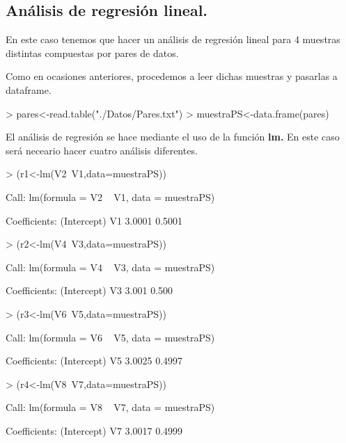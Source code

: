 \documentclass [a4paper] {article}
\begin{document}
\subsection{Análisis de regresión lineal.}
En este caso tenemos que hacer un análisis de regresión lineal para 4 muestras distintas compuestas
por pares de datos.

\bigskip
Como en ocasiones anteriores, procedemos a leer dichas muestras y pasarlas a dataframe.
\begin{Schunk}
\begin{Sinput}
> pares<-read.table("./Datos/Pares.txt")
> muestraPS<-data.frame(pares)
\end{Sinput}
\end{Schunk}

\bigskip
El análisis de regresión se hace mediante el uso de la función \textbf{lm.} En este caso será neceario hacer cuatro análisis diferentes.
\begin{Schunk}
\begin{Sinput}
> (r1<-lm(V2~V1,data=muestraPS))
\end{Sinput}
\begin{Soutput}
Call:
lm(formula = V2 ~ V1, data = muestraPS)

Coefficients:
(Intercept)           V1  
     3.0001       0.5001  
\end{Soutput}
\begin{Sinput}
> (r2<-lm(V4~V3,data=muestraPS))
\end{Sinput}
\begin{Soutput}
Call:
lm(formula = V4 ~ V3, data = muestraPS)

Coefficients:
(Intercept)           V3  
      3.001        0.500  
\end{Soutput}
\begin{Sinput}
> (r3<-lm(V6~V5,data=muestraPS))
\end{Sinput}
\begin{Soutput}
Call:
lm(formula = V6 ~ V5, data = muestraPS)

Coefficients:
(Intercept)           V5  
     3.0025       0.4997  
\end{Soutput}
\begin{Sinput}
> (r4<-lm(V8~V7,data=muestraPS))
\end{Sinput}
\begin{Soutput}
Call:
lm(formula = V8 ~ V7, data = muestraPS)

Coefficients:
(Intercept)           V7  
     3.0017       0.4999  
\end{Soutput}
\end{Schunk}
\end{document}
